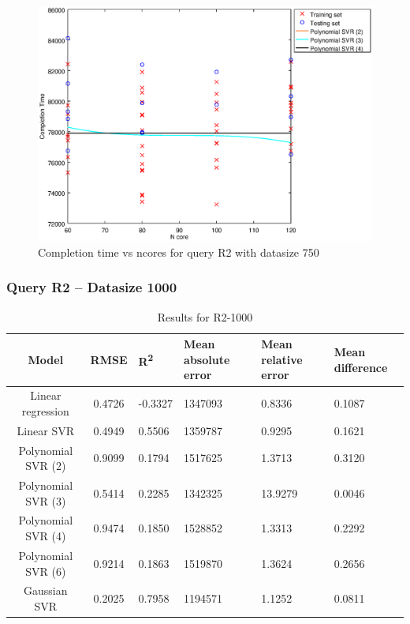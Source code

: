 \documentclass[a4paper,11pt]{article}
\begin{document}
\begin {figure}[hbtp]
\centering
\includegraphics[width=\textwidth]{output/R2_750_ONLY_1_LINEAR_NCORE/plot_R2_750_bestmodels.eps}
\caption{Completion time vs ncores for query R2 with datasize 750}
\label{fig:coreonly_linear_R2_750}
\end {figure}

\newpage
\subsubsection{Query R2 -- Datasize 1000}
\begin{table}[H]
	\centering
	\begin{adjustbox}{center}
		\begin{tabular}{c | c M{1.2cm} M{2.5cm} M{2.5cm} M{1.8cm}}
			Model & RMSE & R\textsuperscript{2} & Mean absolute error & Mean relative error & Mean difference \tabularnewline
			\hline
			Linear regression & 0.4726 & -0.3327 & 1347093 & 0.8336 & 0.1087 \\
			Linear SVR & 0.4949 & 0.5506 & 1359787 & 0.9295 & 0.1621 \\
			Polynomial SVR (2) & 0.9099 & 0.1794 & 1517625 & 1.3713 & 0.3120 \\
			Polynomial SVR (3) & 0.5414 & 0.2285 & 1342325 & 13.9279 & 0.0046 \\
			Polynomial SVR (4) & 0.9474 & 0.1850 & 1528852 & 1.3313 & 0.2292 \\
			Polynomial SVR (6) & 0.9214 & 0.1863 & 1519870 & 1.3624 & 0.2656 \\
			Gaussian SVR & 0.2025 & 0.7958 & 1194571 & 1.1252 & 0.0811 \\
		\end{tabular}
	\end{adjustbox}
	\\
	\caption{Results for R2-1000}
	\label{fig:coreonly_linear_R2_1000}
\end{table}
\end{document}
